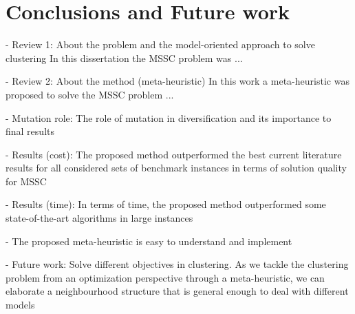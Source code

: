 \chapter{Conclusions and Future work}

- Review 1: About the problem and the model-oriented approach to solve clustering
In this dissertation the MSSC problem was ...

- Review 2: About the method (meta-heuristic)
In this work a meta-heuristic was proposed to solve the MSSC problem ...

- Mutation role: The role of mutation in diversification and its importance to final results

- Results (cost): The proposed method outperformed the best current literature results for all considered sets of benchmark
instances in terms of solution quality for MSSC

- Results (time): In terms of time, the proposed method outperformed some state-of-the-art algorithms in large instances

- The proposed meta-heuristic is easy to understand and implement

- Future work: Solve different objectives in clustering. As we tackle the clustering problem from an optimization perspective through a meta-heuristic, we can elaborate a neighbourhood structure that is general enough to deal with different models